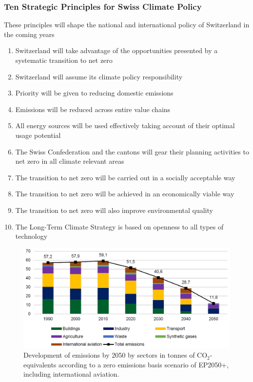 \documentclass[11pt]{article}
\theoremstyle{definition}
\begin{document}
\subsubsection{Ten Strategic Principles for Swiss Climate Policy}
These principles will shape the national and international policy of Switzerland in the coming years
\begin{enumerate}
	\item Switzerland will take advantage of the opportunities presented by a systematic transition to net zero
	\item Switzerland will assume its climate policy responsibility
	\item Priority will be given to reducing domestic emissions
	\item Emissions will be reduced across entire value chains
	\item All energy sources will be used effectively taking account of their optimal usage potential
	\item The Swiss Confederation and the cantons will gear their planning activities to net zero in all climate relevant areas
	\item The transition to net zero will be carried out in a socially acceptable way
	\item The transition to net zero will be achieved in an economically viable way
	\item The transition to net zero will also improve environmental quality
	\item The Long-Term Climate Strategy is based on openness to all types of technology
\end{enumerate}

\begin{figure}[H]
	\centering
	\includegraphics[width=0.8\linewidth]{img/development_emissions_plan_switzerland}
	\caption{Development of emissions by 2050 by sectors in tonnes of $\text{CO}_2$-equivalents according to a zero emissions basis scenario of EP2050+, including international aviation.}
	\label{fig:developmentemissionsplanswitzerland}
\end{figure}
\end{document}
